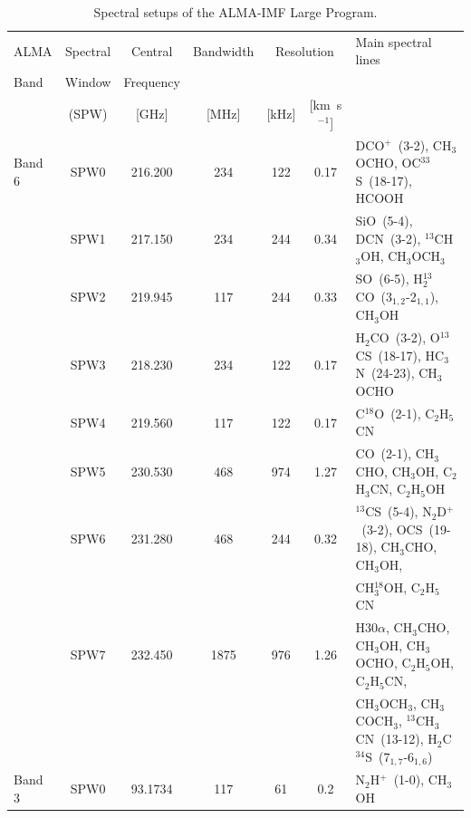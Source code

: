 \documentclass[longauth]{aa} %
\newcommand{\kms}{\textrm{km~s}\ensuremath{^{-1}}\xspace}       %
\begin{document}
\begin{table}[htbp!]
\centering
\small
\begin{threeparttable}[c]
\caption{Spectral setups of the ALMA-IMF Large Program.}
\label{tab:spws_fred}
 \begin{tabular}{lcccccl}
\hline \noalign {\smallskip}
ALMA  & Spectral  & Central & Bandwidth & \multicolumn{2}{c}{Resolution\tnote{1}}  & Main spectral lines \\
Band  & Window & Frequency &  &  &  &  \\
      &  (SPW)      & [GHz] & [MHz] & [kHz] & [\kms] &  \\

\hline \noalign {\smallskip}
Band 6  & SPW0 & 216.200  & 234 & 122 & 0.17 & DCO$^+$~(3-2), CH$_{3}$OCHO, OC$^{33}$S~(18-17), HCOOH \\ %
        & SPW1 & 217.150  & 234 & 244 & 0.34  &
        SiO~(5-4), DCN~(3-2), $^{13}$CH$_{3}$OH, CH$_{3}$OCH$_{3}$ \\ %
        & SPW2 & 219.945  & 117 & 244 & 0.33  & SO~(6-5), H$_{2}^{13}$CO~(3$_{1,2}$-2$_{1, 1}$), CH$_{3}$OH \\ %
        & SPW3 & 218.230  & 234 & 122 & 0.17  & H$_{2}$CO~(3-2), O$^{13}$CS~(18-17), HC$_{3}$N~(24-23), CH$_{3}$OCHO \\%
        & SPW4 & 219.560  & 117 & 122 & 0.17   & C$^{18}$O~(2-1), C$_{2}$H$_{5}$CN \\ %
        & SPW5 & 230.530  & 468 & 974 & 1.27  & CO~(2-1), CH$_{3}$CHO, CH$_{3}$OH, C$_{2}$H$_{3}$CN, C$_{2}$H$_{5}$OH \\%
        & SPW6 & 231.280  & 468 & 244 & 0.32 & $^{13}$CS~(5-4), N$_{2}$D$^{+}$~(3-2), OCS~(19-18), CH$_{3}$CHO, CH$_{3}$OH,\\
        & & & & & &     CH$_{3}^{18}$OH, C$_{2}$H$_{5}$CN \\ %
        & SPW7 & 232.450  & 1875   & 976 & 1.26 & H30$\alpha$, CH$_{3}$CHO, CH$_{3}$OH, CH$_{3}$OCHO, C$_{2}$H$_{5}$OH, C$_{2}$H$_{5}$CN, \\
        & & & & & & CH$_{3}$OCH$_{3}$, CH$_{3}$COCH$_{3}$, $^{13}$CH$_{3}$CN~(13-12), H$_{2}$C$^{34}$S~(7$_{1,7}$-6$_{1,6}$)  \\      %
        \hline
Band 3  & SPW0 & 93.1734 & 117 & 61 & 0.2 & N$_{2}$H$^{+}$~(1-0), CH$_{3}$OH \\ %

\end{tabular}
\end{threeparttable}
\end{table}
\end{document}
